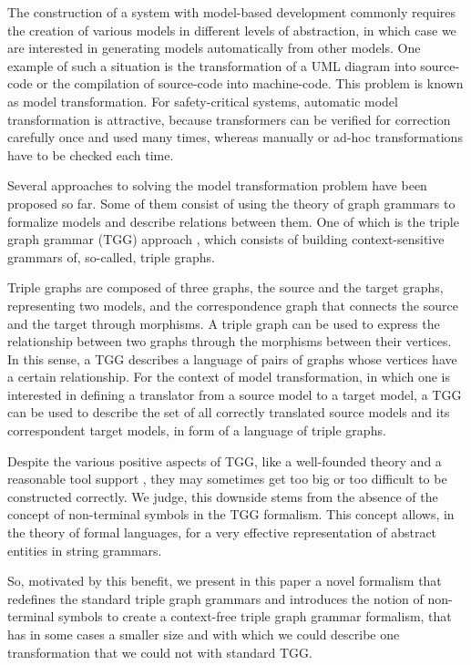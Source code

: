 \documentclass[runningheads]{llncs}
\begin{document}
The construction of a system with model-based development commonly requires the creation of various models in different levels of abstraction, in which case we are interested in generating models automatically from other models. One example of such a situation is the transformation of a UML diagram into source-code or the compilation of source-code into machine-code. This problem is known as model transformation. For safety-critical systems, automatic model transformation is attractive, because transformers can be verified for correction carefully once and used many times, whereas manually or ad-hoc transformations have to be checked each time.

Several approaches to solving the model transformation problem have been proposed so far. Some of them consist of using the theory of graph grammars to formalize models and describe relations between them. One of which is the triple graph grammar (TGG) approach \cite{schurr1994specification}, which consists of building context-sensitive grammars of, so-called, triple graphs.

Triple graphs are composed of three graphs, the source and the target graphs, representing two models, and the correspondence graph that connects the source and the target through morphisms. A triple graph can be used to express the relationship between two graphs through the morphisms between their vertices. In this sense, a TGG describes a language of pairs of graphs whose vertices have a certain relationship. For the context of model transformation, in which one is interested in defining a translator from a source model to a target model, a TGG can be used to describe the set of all correctly translated source models and its correspondent target models, in form of a language of triple graphs.

Despite the various positive aspects of TGG, like a well-founded theory and a reasonable tool support \cite{anjorin201620}, they may sometimes get too big or too difficult to be constructed correctly. We judge, this downside stems from the absence of the concept of non-terminal symbols in the TGG formalism. This concept allows, in the theory of formal languages, for a very effective representation of abstract entities in string grammars.

So, motivated by this benefit, we present in this paper a novel formalism that redefines the standard triple graph grammars and introduces the notion of non-terminal symbols to create a context-free triple graph grammar formalism, that has in some cases a smaller size and with which we could describe one transformation that we could not with standard TGG.
\end{document}
